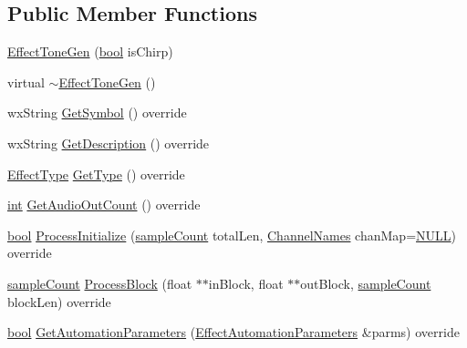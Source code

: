 \subsection*{Public Member Functions}
\begin{DoxyCompactItemize}
\item 
\hyperlink{class_effect_tone_gen_ac083529221eb3d92a4714230ab55973d}{Effect\+Tone\+Gen} (\hyperlink{mac_2config_2i386_2lib-src_2libsoxr_2soxr-config_8h_abb452686968e48b67397da5f97445f5b}{bool} is\+Chirp)
\item 
virtual \hyperlink{class_effect_tone_gen_a3ddd8f7d8128877ffe8263cb3d3c5db1}{$\sim$\+Effect\+Tone\+Gen} ()
\item 
wx\+String \hyperlink{class_effect_tone_gen_a8b1b87b80f5ef696e0a49295cc24806f}{Get\+Symbol} () override
\item 
wx\+String \hyperlink{class_effect_tone_gen_a20c3f34ac20ea1f57765423d7590efdf}{Get\+Description} () override
\item 
\hyperlink{_effect_interface_8h_a4809a7bb3fd1a421902a667cc1405d43}{Effect\+Type} \hyperlink{class_effect_tone_gen_a76c23f89ac393e25446d7cf66c5750fa}{Get\+Type} () override
\item 
\hyperlink{xmltok_8h_a5a0d4a5641ce434f1d23533f2b2e6653}{int} \hyperlink{class_effect_tone_gen_a5e96f884ff2d79601a442273c8f04532}{Get\+Audio\+Out\+Count} () override
\item 
\hyperlink{mac_2config_2i386_2lib-src_2libsoxr_2soxr-config_8h_abb452686968e48b67397da5f97445f5b}{bool} \hyperlink{class_effect_tone_gen_a568983184b9baa24b1145b71846bc28d}{Process\+Initialize} (\hyperlink{include_2audacity_2_types_8h_afa427e1f521ea5ec12d054e8bd4d0f71}{sample\+Count} total\+Len, \hyperlink{include_2audacity_2_types_8h_a4f0f42a04250c39bbe0ce6cb26aa3b48}{Channel\+Names} chan\+Map=\hyperlink{px__mixer_8h_a070d2ce7b6bb7e5c05602aa8c308d0c4}{N\+U\+LL}) override
\item 
\hyperlink{include_2audacity_2_types_8h_afa427e1f521ea5ec12d054e8bd4d0f71}{sample\+Count} \hyperlink{class_effect_tone_gen_a605f07c57cc634be894d5af13b09ba94}{Process\+Block} (float $\ast$$\ast$in\+Block, float $\ast$$\ast$out\+Block, \hyperlink{include_2audacity_2_types_8h_afa427e1f521ea5ec12d054e8bd4d0f71}{sample\+Count} block\+Len) override
\item 
\hyperlink{mac_2config_2i386_2lib-src_2libsoxr_2soxr-config_8h_abb452686968e48b67397da5f97445f5b}{bool} \hyperlink{class_effect_tone_gen_a5754967d293f776db9fb8434fb1e6979}{Get\+Automation\+Parameters} (\hyperlink{class_effect_automation_parameters}{Effect\+Automation\+Parameters} \&parms) override

\end{DoxyCompactItemize}
